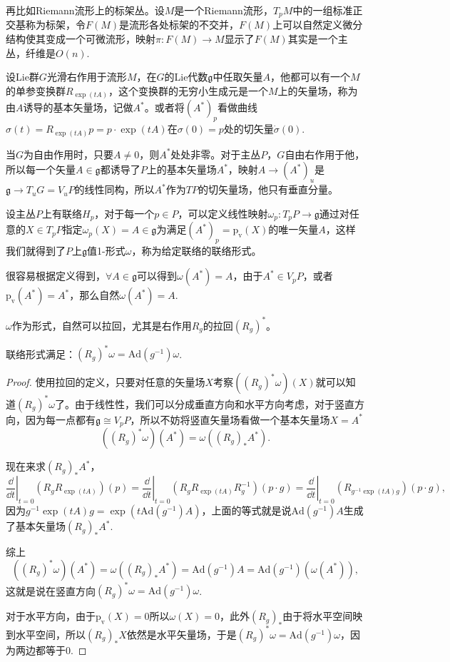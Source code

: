 再比如Riemann流形上的标架丛。设$M$是一个Riemann流形，$T_pM$中的一组标准正交基称为标架，令$F(M)$是流形各处标架的不交并，$F(M)$上可以自然定义微分结构使其变成一个可微流形，映射$\pi :F(M)\to M$显示了$F(M)$其实是一个主丛，纤维是$O(n)$.

\begin{defi}
	设Lie群$G$光滑右作用于流形$M$，在$G$的Lie代数$\mathfrak{g}$中任取矢量$A$，他都可以有一个$M$的单参变换群$R_{\exp(tA)}$，这个变换群的无穷小生成元是一个$M$上的矢量场，称为由$A$诱导的基本矢量场，记做$A^*$。或者将$(A^*)_p$看做曲线$\sigma(t)=R_{\exp(tA)}p=p\cdot\exp(tA)$在$\sigma(0)=p$处的切矢量$\dot\sigma(0)$.
\end{defi}
当$G$为自由作用时，只要$A\neq 0$，则$A^*$处处非零。对于主丛$P$，$G$自由右作用于他，所以每一个矢量$A\in \mathfrak{g}$都诱导了$P$上的基本矢量场$A^*$，映射$A\to (A^*)_u$是$\mathfrak{g}\to T_uG=V_uP$的线性同构，所以$A^*$作为$TP$的切矢量场，他只有垂直分量。

设主丛$P$上有联络$H_p$，对于每一个$p\in P$，可以定义线性映射$\omega_p:T_p P\to \mathfrak{g}$通过对任意的$X\in T_p P$指定$\omega_p(X)=A\in \mathfrak{g}$为满足$(A^*)_p=\mathrm{p_v}(X)$的唯一矢量$A$，这样我们就得到了$P$上$\mathfrak{g}$值1-形式$\omega$，称为给定联络的联络形式。

很容易根据定义得到，$\forall A\in\mathfrak{g}$可以得到$\omega(A^*)=A$，由于$A^*\in V_pP$，或者$\mathrm{p_v}(A^*)=A^*$，那么自然$\omega(A^*)=A$.

$\omega$作为形式，自然可以拉回，尤其是右作用$R_g$的拉回$(R_g)^*$。
\begin{pro}
	联络形式满足：$(R_g)^*\omega=\mathrm{Ad}(g^{-1})\omega$.
\end{pro}
\begin{proof}
使用拉回的定义，只要对任意的矢量场$X$考察$((R_g)^*\omega)(X)$就可以知道$(R_g)^*\omega$了。由于线性性，我们可以分成垂直方向和水平方向考虑，对于竖直方向，因为每一点都有$\mathfrak{g}\cong V_pP$，所以不妨将竖直矢量场看做一个基本矢量场$X=A^*$
\[
	((R_g)^*\omega)(A^*)=\omega((R_g)_*A^*).
\]

现在来求$(R_g)_*A^*$，
\[
	\left.\frac{\dd}{\dd t}\right|_{t=0}(R_gR_{\exp(tA)})(p)=\left.\frac{\dd}{\dd t}\right|_{t=0}(R_gR_{\exp(tA)}R_g^{-1})(p\cdot g)=\left.\frac{\dd}{\dd t}\right|_{t=0}(R_{g^{-1}\exp(tA)g})(p\cdot g),
\]
因为$g^{-1}\exp(tA)g=\exp(t\mathrm{Ad}(g^{-1})A)$，上面的等式就是说$\mathrm{Ad}(g^{-1})A$生成了基本矢量场$\left(R_g\right)_*A^*$.

综上
\[
	((R_g)^*\omega)(A^*)=\omega((R_g)_*A^*)=\mathrm{Ad}(g^{-1})A=\mathrm{Ad}(g^{-1})(\omega(A^*)),
\]
这就是说在竖直方向$(R_g)^*\omega=\mathrm{Ad}(g^{-1})\omega$.

对于水平方向，由于$\mathrm{p_v}(X)=0$所以$\omega(X)=0$，此外$(R_g)_*$由于将水平空间映到水平空间，所以$(R_g)_*X$依然是水平矢量场，于是$(R_g)^*\omega=\mathrm{Ad}(g^{-1})\omega$，因为两边都等于0.
\end{proof}

